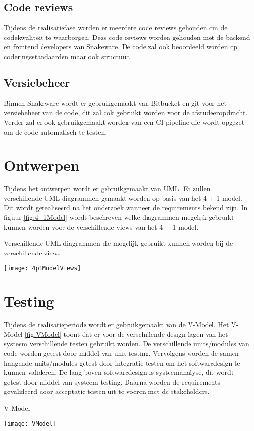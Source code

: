 \subsection{Code reviews}
Tijdens de realisatiefase worden er meerdere code reviews gehouden om de codekwaliteit te waarborgen.
Deze code reviews worden gehouden met de backend en frontend developers van Snakeware.
De code zal ook beoordeeld worden op coderingsstandaarden maar ook structuur.
\subsection{Versiebeheer}
Binnen Snakeware wordt er gebruikgemaakt van Bitbucket en git voor het versiebeheer van de code, dit zal ook gebruikt worden voor de afstudeeropdracht.
Verder zal er ook gebruikgemaakt worden van een CI-pipeline die wordt opgezet om de code automatisch te testen.
\section{Ontwerpen}
\label{sec:Ontwerpen}
Tijdens het ontwerpen wordt er gebruikgemaakt van UML.
Er zullen verschillende UML diagrammen gemaakt worden op basis van het 4 + 1 model.
Dit wordt gerealiseerd na het onderzoek wanneer de requirements bekend zijn.
In figuur \ref{fig:4+1Model} wordt beschreven welke diagrammen mogelijk gebruikt kunnen worden voor de verschillende views van het 4 + 1 model.\\
\begin{graphic}
    \vspace{0.2cm}
    \captionsetup{type=figure}
    \caption{Verschillende UML diagrammen die mogelijk gebruikt kunnen worden bij de verschillende views \Parencite{4p1ModelViews}}
    \texttt{[image: 4p1ModelViews]}
    \label{fig:4+1Model}
    \vspace{0.2cm}
\end{graphic}
\newpage
\section{Testing}
\label{sec:Testing}
Tijdens de realisatieperiode wordt er gebruikgemaakt van de V-Model.
Het V-Model \ref{fig:VModel} toont dat er voor de verschillende design lagen van het systeem verschillende testen gebruikt worden.
De verschillende units/modules van code worden getest door middel van unit testing.
Vervolgens worden de samen hangende units/modules getest door integratie testen om het softwaredesign te kunnen valideren.
De laag boven softwaredesign is systeemanalyse, dit wordt getest door middel van systeem testing.
Daarna worden de requirements gevalideerd door acceptatie testen uit te voeren met de stakeholders. \\
\begin{graphic}
    \vspace{0.2cm}
    \captionsetup{type=figure}
    \caption{V-Model \Parencite{VModel}}
    \texttt{[image: VModel]}
    \label{fig:VModel}
    \vspace{0.2cm}
\end{graphic}
